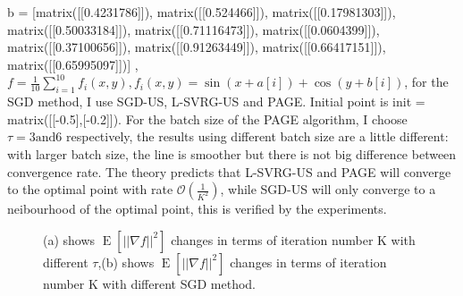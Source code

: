 \documentclass[12pt,a4paper]{article}
\DeclareMathOperator{\E}{\mathrm{E}}
\begin{document}
	b = [matrix([[0.4231786]]), matrix([[0.524466]]), matrix([[0.17981303]]), matrix([[0.50033184]]), matrix([[0.71116473]]), matrix([[0.0604399]]), matrix([[0.37100656]]), matrix([[0.91263449]]), matrix([[0.66417151]]), matrix([[0.65995097]])]
	,$f=\frac{1}{10}\sum_{i=1}^{10}f_i(x,y),f_i(x,y)=\sin(x+a[i])+\cos(y+b[i])$, for the SGD method, I use SGD-US,  L-SVRG-US and PAGE. Initial point is init = matrix([[-0.5],[-0.2]]). For the batch size of the PAGE algorithm, I choose $\tau = 3 \text{and} 6$ respectively, the results using different batch size are a little different: with larger batch size, the line is smoother but there is not big difference between convergence rate.
	\newline 
	The theory predicts that L-SVRG-US and  PAGE will converge to the optimal point with rate $\mathcal{O}(\frac{1}{K^2})$, while SGD-US will only converge to a neibourhood of the optimal point, this is verified by the experiments.
	\begin{figure}
		\centering
		
		
		\caption{ (a) shows $\E\left[||\nabla f||^2\right]$ changes in terms of iteration number K with different $\tau$,(b)  shows $\E\left[||\nabla f||^2\right]$ changes in terms of iteration number K with different SGD method.} %
		\label{img2}
	\end{figure}
	
	
\end{document}
